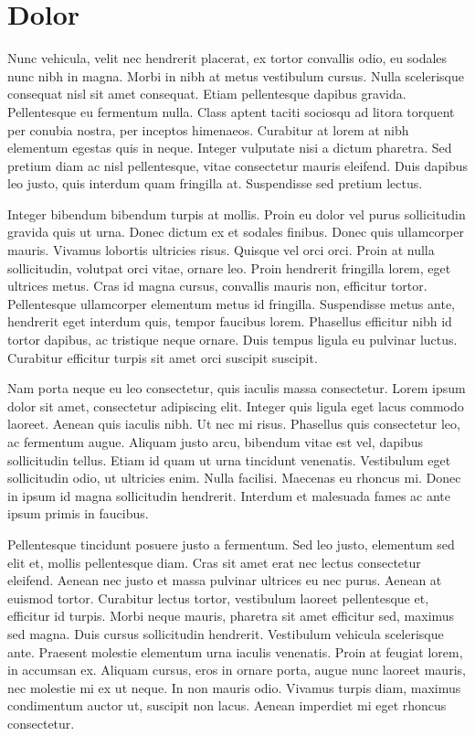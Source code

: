 \section{Dolor}
 Nunc vehicula, velit nec hendrerit placerat, ex tortor convallis odio, eu sodales nunc nibh in magna. Morbi in nibh at metus vestibulum cursus. Nulla scelerisque consequat nisl sit amet consequat. Etiam pellentesque dapibus gravida. Pellentesque eu fermentum nulla. Class aptent taciti sociosqu ad litora torquent per conubia nostra, per inceptos himenaeos. Curabitur at lorem at nibh elementum egestas quis in neque. Integer vulputate nisi a dictum pharetra. Sed pretium diam ac nisl pellentesque, vitae consectetur mauris eleifend. Duis dapibus leo justo, quis interdum quam fringilla at. Suspendisse sed pretium lectus.
 
 Integer bibendum bibendum turpis at mollis. Proin eu dolor vel purus sollicitudin gravida quis ut urna. Donec dictum ex et sodales finibus. Donec quis ullamcorper mauris. Vivamus lobortis ultricies risus. Quisque vel orci orci. Proin at nulla sollicitudin, volutpat orci vitae, ornare leo. Proin hendrerit fringilla lorem, eget ultrices metus. Cras id magna cursus, convallis mauris non, efficitur tortor. Pellentesque ullamcorper elementum metus id fringilla. Suspendisse metus ante, hendrerit eget interdum quis, tempor faucibus lorem. Phasellus efficitur nibh id tortor dapibus, ac tristique neque ornare. Duis tempus ligula eu pulvinar luctus. Curabitur efficitur turpis sit amet orci suscipit suscipit.
 
 Nam porta neque eu leo consectetur, quis iaculis massa consectetur. Lorem ipsum dolor sit amet, consectetur adipiscing elit. Integer quis ligula eget lacus commodo laoreet. Aenean quis iaculis nibh. Ut nec mi risus. Phasellus quis consectetur leo, ac fermentum augue. Aliquam justo arcu, bibendum vitae est vel, dapibus sollicitudin tellus. Etiam id quam ut urna tincidunt venenatis. Vestibulum eget sollicitudin odio, ut ultricies enim. Nulla facilisi. Maecenas eu rhoncus mi. Donec in ipsum id magna sollicitudin hendrerit. Interdum et malesuada fames ac ante ipsum primis in faucibus.
 
 Pellentesque tincidunt posuere justo a fermentum. Sed leo justo, elementum sed elit et, mollis pellentesque diam. Cras sit amet erat nec lectus consectetur eleifend. Aenean nec justo et massa pulvinar ultrices eu nec purus. Aenean at euismod tortor. Curabitur lectus tortor, vestibulum laoreet pellentesque et, efficitur id turpis. Morbi neque mauris, pharetra sit amet efficitur sed, maximus sed magna. Duis cursus sollicitudin hendrerit. Vestibulum vehicula scelerisque ante. Praesent molestie elementum urna iaculis venenatis. Proin at feugiat lorem, in accumsan ex. Aliquam cursus, eros in ornare porta, augue nunc laoreet mauris, nec molestie mi ex ut neque. In non mauris odio. Vivamus turpis diam, maximus condimentum auctor ut, suscipit non lacus. Aenean imperdiet mi eget rhoncus consectetur.
 
